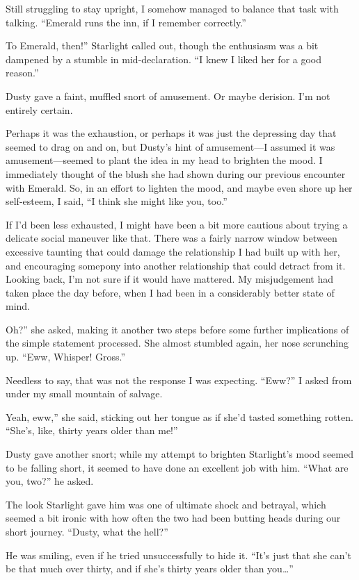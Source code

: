 Still struggling to stay upright, I somehow managed to balance that task with talking. “Emerald runs the inn, if I remember correctly.”

\leavevmode{}To Emerald, then!” Starlight called out, though the enthusiasm was a bit dampened by a stumble in mid-declaration. “I knew I liked her for a good reason.”

Dusty gave a faint, muffled snort of amusement. Or maybe derision. I’m not entirely certain.

Perhaps it was the exhaustion, or perhaps it was just the depressing day that seemed to drag on and on, but Dusty’s hint of amusement—I assumed it was amusement—seemed to plant the idea in my head to brighten the mood. I immediately thought of the blush she had shown during our previous encounter with Emerald. So, in an effort to lighten the mood, and maybe even shore up her self-esteem, I said, “I think she might like you, too.”

If I’d been less exhausted, I might have been a bit more cautious about trying a delicate social maneuver like that. There was a fairly narrow window between excessive taunting that could damage the relationship I had built up with her, and encouraging somepony into another relationship that could detract from it. Looking back, I’m not sure if it would have mattered. My misjudgement had taken place the day before, when I had been in a considerably better state of mind.

\leavevmode{}Oh?” she asked, making it another two steps before some further implications of the simple statement processed. She almost stumbled again, her nose scrunching up. “Eww, Whisper! Gross.”

Needless to say, that was not the response I was expecting. “Eww?” I asked from under my small mountain of salvage.

\leavevmode{}Yeah, eww,” she said, sticking out her tongue as if she’d tasted something rotten. “She’s, like, thirty years older than me!”

Dusty gave another snort; while my attempt to brighten Starlight’s mood seemed to be falling short, it seemed to have done an excellent job with him. “What are you, two?” he asked.

The look Starlight gave him was one of ultimate shock and betrayal, which seemed a bit ironic with how often the two had been butting heads during our short journey. “Dusty, what the hell?”

He was smiling, even if he tried unsuccessfully to hide it. “It’s just that she can’t be that much over thirty, and if she’s thirty years older than you…”

